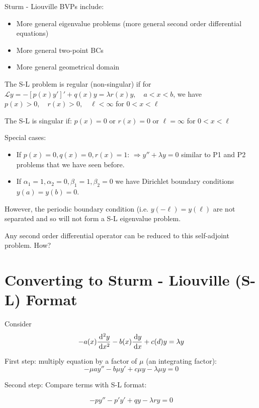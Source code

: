\documentclass{article}
\begin{document}
\hfill

Sturm - Liouville BVPs include:

\begin{itemize}
    \item More general eigenvalue problems (more general second order differential equations)
    \item More general two-point BCs
    \item More general geometrical domain
\end{itemize}

The S-L problem is regular (non-singular) if for $\mathcal{L} y = - \left[ p(x) y' \right]' + q(x) y = \lambda r(x) y, \quad a < x < b$, we have $p(x) > 0, \quad r(x) > 0, \quad \ell < \infty$ for $0 < x < \ell$

The S-L is singular if: $p(x) = 0$ or $r(x) = 0$ or $\ell = \infty$ for $0 < x < \ell$

Special cases:

\begin{itemize}
    \item If $p(x) = 0, q(x) = 0, r(x) = 1$: $\Rightarrow y'' + \lambda y = 0$ similar to P1 and P2 problems that we have seen before. 
    \item If $\alpha_1 = 1, \alpha_2 = 0, \beta_1 = 1, \beta_2 = 0$ we have Dirichlet boundary conditions $y(a) = y(b) = 0$. 
\end{itemize}

However, the periodic boundary condition (i.e. $y(-\ell) = y(\ell)$ are not separated and so will not form a S-L eigenvalue problem. 

Any second order differential operator can be reduced to this self-adjoint problem. How?

\section{Converting to Sturm - Liouville (S-L) Format}

Consider $$-a (x) \frac{\,\mathrm{d}^2 y}{\,\mathrm{d} x^2} - b(x) \frac{\,\mathrm{d} y}{\,\mathrm{d} x} + c(d) y = \lambda y$$

First step: multiply equation by a factor of $\mu$ (an integrating factor):
\begin{equation}
\label{**}
    - \mu a y'' - b \mu y' + c \mu y - \lambda \mu y = 0
\end{equation}

Second step: Compare terms with S-L format:

$$-p y'' - p' y' + qy - \lambda r y = 0$$
\end{document}
